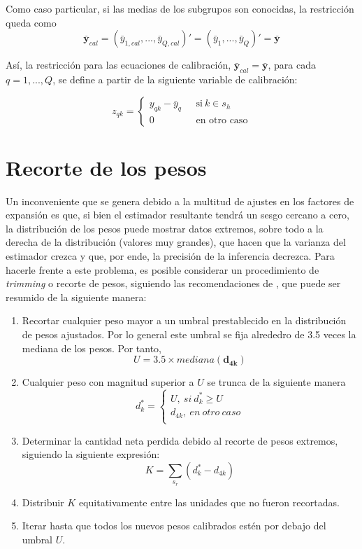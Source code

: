 \documentclass[
  10pt,
  spanish,
]{book}
\providecommand{\tightlist}{%
  \setlength{\itemsep}{0pt}\setlength{\parskip}{0pt}}
\begin{document}
Como caso particular, si las medias de los subgrupos son conocidas, la restricción queda como
\[
\bar{\textbf{y}}_{cal} = (\bar{y}_{1,cal},...,\bar{y}_{Q,cal})' = (\bar{y}_{1},...,\bar{y}_{Q})' = \bar{\textbf{y}}
\]

Así, la restricción para las ecuaciones de calibración, \(\bar{\textbf{y}}_{cal} = \bar{\textbf{y}}\), para cada \(q = 1,...,Q\), se define a partir de la siguiente variable de calibración:

\begin{equation*}
z_{qk} = 
\begin{cases} 
y_{qk} - \bar{y}_{q} \ \ \ &\text{si} \ k \in s_h \\ 
0 &\text{en otro caso}
\end{cases}
\end{equation*}

\hypertarget{recorte-de-los-pesos}{%
\section{Recorte de los pesos}\label{recorte-de-los-pesos}}

Un inconveniente que se genera debido a la multitud de ajustes en los factores de expansión es que, si bien el estimador resultante tendrá un sesgo cercano a cero, la distribución de los pesos puede mostrar datos extremos, sobre todo a la derecha de la distribución (valores muy grandes), que hacen que la varianza del estimador crezca y que, por ende, la precisión de la inferencia decrezca. Para hacerle frente a este problema, es posible considerar un procedimiento de \emph{trimming} o recorte de pesos, siguiendo las recomendaciones de \citet[sec.~14.4]{Valliant_Dever_Kreuter_2018}, que puede ser resumido de la siguiente manera:

\begin{enumerate}
\def\labelenumi{\arabic{enumi}.}
\tightlist
\item
  Recortar cualquier peso mayor a un umbral prestablecido en la distribución de pesos ajustados. Por lo general este umbral se fija alrededro de 3.5 veces la mediana de los pesos. Por tanto,
  \[
  U=3.5\times mediana(\mathbf{d_{4k}})
  \]
\item
  Cualquier peso con magnitud superior a \(U\) se trunca de la siguiente manera
  \[
  d_k^\ast=\left\{\begin{matrix}U,\ si\ d_k^\ast\geq U\\
  d_{4k},\ en\ otro\ caso\\\end{matrix}\right.
  \]
\item
  Determinar la cantidad neta perdida debido al recorte de pesos extremos, siguiendo la siguiente expresión:
  \[
  K=\sum_{s_r}(d_k^\ast - d_{4k})
  \]
\item
  Distribuir \(K\) equitativamente entre las unidades que no fueron recortadas.
\item
  Iterar hasta que todos los nuevos pesos calibrados estén por debajo del umbral \(U\).
\end{enumerate}
\end{document}
